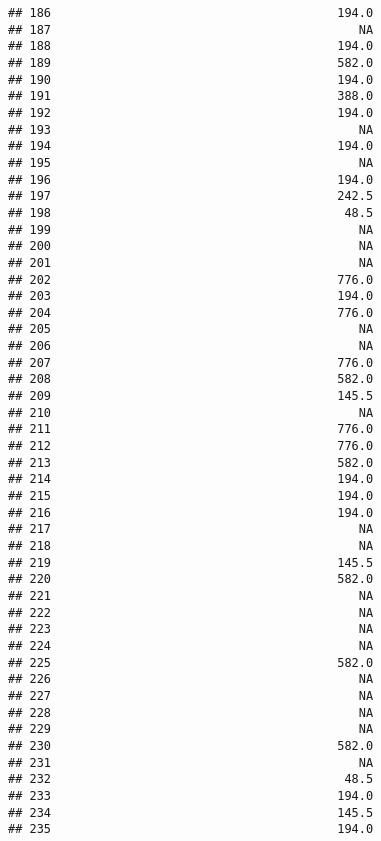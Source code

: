 \documentclass[
]{article}
\begin{document}
\begin{verbatim}
## 186                                        194.0
## 187                                           NA
## 188                                        194.0
## 189                                        582.0
## 190                                        194.0
## 191                                        388.0
## 192                                        194.0
## 193                                           NA
## 194                                        194.0
## 195                                           NA
## 196                                        194.0
## 197                                        242.5
## 198                                         48.5
## 199                                           NA
## 200                                           NA
## 201                                           NA
## 202                                        776.0
## 203                                        194.0
## 204                                        776.0
## 205                                           NA
## 206                                           NA
## 207                                        776.0
## 208                                        582.0
## 209                                        145.5
## 210                                           NA
## 211                                        776.0
## 212                                        776.0
## 213                                        582.0
## 214                                        194.0
## 215                                        194.0
## 216                                        194.0
## 217                                           NA
## 218                                           NA
## 219                                        145.5
## 220                                        582.0
## 221                                           NA
## 222                                           NA
## 223                                           NA
## 224                                           NA
## 225                                        582.0
## 226                                           NA
## 227                                           NA
## 228                                           NA
## 229                                           NA
## 230                                        582.0
## 231                                           NA
## 232                                         48.5
## 233                                        194.0
## 234                                        145.5
## 235                                        194.0

\end{verbatim}
\end{document}
